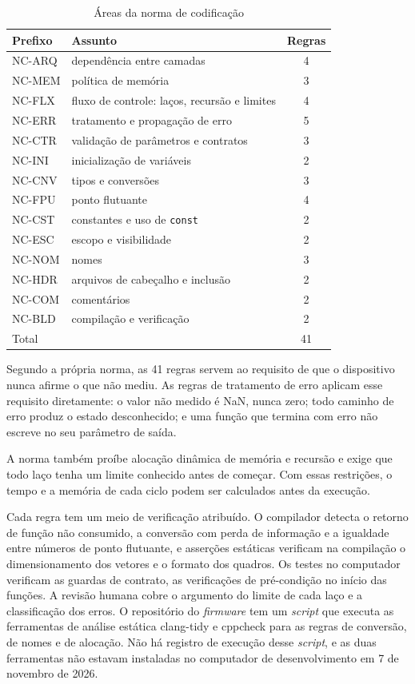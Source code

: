 \begin{table}[!htb]
\centering\small
\caption{Áreas da norma de codificação}\label{tab:sis-norma}
\begin{tabular}{@{}llc@{}}
\toprule
Prefixo & Assunto & Regras \\
\midrule
NC-ARQ & dependência entre camadas & 4 \\
NC-MEM & política de memória & 3 \\
NC-FLX & fluxo de controle: laços, recursão e limites & 4 \\
NC-ERR & tratamento e propagação de erro & 5 \\
NC-CTR & validação de parâmetros e contratos & 3 \\
NC-INI & inicialização de variáveis & 2 \\
NC-CNV & tipos e conversões & 3 \\
NC-FPU & ponto flutuante & 4 \\
NC-CST & constantes e uso de \texttt{const} & 2 \\
NC-ESC & escopo e visibilidade & 2 \\
NC-NOM & nomes & 3 \\
NC-HDR & arquivos de cabeçalho e inclusão & 2 \\
NC-COM & comentários & 2 \\
NC-BLD & compilação e verificação & 2 \\
\midrule
Total & & 41 \\
\bottomrule
\end{tabular}
\end{table}

Segundo a própria norma, as \num{41} regras servem ao requisito de que o dispositivo nunca afirme o que não mediu. As regras de tratamento de erro aplicam esse requisito diretamente: o valor não medido é NaN, nunca zero; todo caminho de erro produz o estado desconhecido; e uma função que termina com erro não escreve no seu parâmetro de saída.

A norma também proíbe alocação dinâmica de memória e recursão e exige que todo laço tenha um limite conhecido antes de começar. Com essas restrições, o tempo e a memória de cada ciclo podem ser calculados antes da execução.

Cada regra tem um meio de verificação atribuído. O compilador detecta o retorno de função não consumido, a conversão com perda de informação e a igualdade entre números de ponto flutuante, e asserções estáticas verificam na compilação o dimensionamento dos vetores e o formato dos quadros. Os testes no computador verificam as guardas de contrato, as verificações de pré-condição no início das funções. A revisão humana cobre o argumento do limite de cada laço e a classificação dos erros. O repositório do \textit{firmware} tem um \textit{script} que executa as ferramentas de análise estática clang-tidy e cppcheck para as regras de conversão, de nomes e de alocação. Não há registro de execução desse \textit{script}, e as duas ferramentas não estavam instaladas no computador de desenvolvimento em 7 de novembro de 2026.

